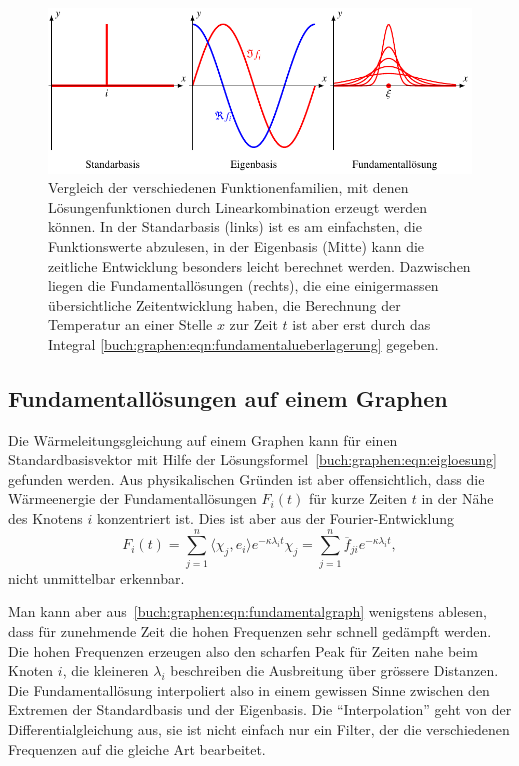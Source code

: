 \begin{figure}
\centering
\includegraphics{chapters/70-graphen/images/fundamental.pdf}
\caption{Vergleich der verschiedenen Funktionenfamilien, mit denen
Lösungenfunktionen durch Linearkombination erzeugt werden können.
In der Standarbasis (links) ist es am einfachsten, die Funktionswerte
abzulesen, in der Eigenbasis (Mitte) kann die zeitliche Entwicklung
besonders leicht berechnet werden.
Dazwischen liegen die Fundamentallösungen (rechts), die eine einigermassen
übersichtliche Zeitentwicklung haben, die Berechnung der Temperatur an 
einer Stelle $x$ zur Zeit $t$ ist aber erst durch das Integral
\eqref{buch:graphen:eqn:fundamentalueberlagerung} gegeben.
\label{buch:graphen:fig:fundamental}}
\end{figure}

\subsection{Fundamentallösungen auf einem Graphen}
Die Wärmeleitungsgleichung auf einem Graphen kann für einen
Standardbasisvektor mit Hilfe der
Lösungsformel~\eqref{buch:graphen:eqn:eigloesung}
gefunden werden.
Aus physikalischen Gründen ist aber offensichtlich, dass die
Wärmeenergie der Fundamentallösungen $F_i(t)$ für kurze Zeiten $t$
in der Nähe des Knotens $i$ konzentriert ist.
Dies ist aber aus der Fourier-Entwicklung
\begin{equation}
F_i(t)
=
\sum_{j=1}^n \langle \chi_j,e_i\rangle e^{-\kappa \lambda_i t} \chi_j
=
\sum_{j=1}^n \overline{f}_{ji} e^{-\kappa \lambda_i t},
\label{buch:graphen:eqn:fundamentalgraph}
\end{equation}
nicht unmittelbar erkennbar.

Man kann aber aus~\eqref{buch:graphen:eqn:fundamentalgraph}
wenigstens ablesen,
dass für zunehmende Zeit die hohen Frequenzen sehr schnell gedämpft
werden.
Die hohen Frequenzen erzeugen also den scharfen Peak für Zeiten nahe
beim Knoten $i$, die kleineren $\lambda_i$ beschreiben die Ausbreitung
über grössere Distanzen.
Die Fundamentallösung interpoliert also in einem gewissen Sinne zwischen
den Extremen der Standardbasis und der Eigenbasis.
Die ``Interpolation'' geht von der Differentialgleichung aus,
sie ist nicht einfach nur ein Filter, der die verschiedenen Frequenzen
auf die gleiche Art bearbeitet.

